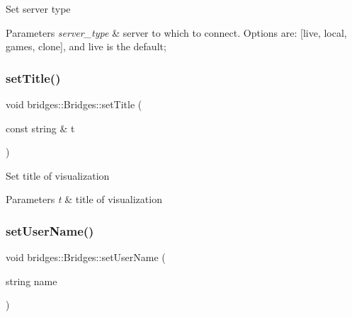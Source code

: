 Set server type


\begin{DoxyParams}{Parameters}
{\em server\+\_\+type} & server to which to connect. Options are\+: \mbox{[}\textquotesingle{}live\textquotesingle{}, \textquotesingle{}local\textquotesingle{}, \textquotesingle{}games\textquotesingle{}, \textquotesingle{}clone\textquotesingle{}\mbox{]}, and \textquotesingle{}live\textquotesingle{} is the default; \\
\hline
\end{DoxyParams}
\mbox{\label{classbridges_1_1_bridges_ac9f2e0b5fd5c70053db233dcbb636b56}} 
\subsubsection{\texorpdfstring{setTitle()}{setTitle()}}
{\footnotesize\ttfamily void bridges\+::\+Bridges\+::set\+Title (\begin{DoxyParamCaption}\item[{const string \&}]{t }\end{DoxyParamCaption})\hspace{0.3cm}{\ttfamily [inline]}}

Set title of visualization


\begin{DoxyParams}{Parameters}
{\em t} & title of visualization \\
\hline
\end{DoxyParams}
\mbox{\label{classbridges_1_1_bridges_a383c5c1d3c85541f466e0cb60dde1c29}} 
\subsubsection{\texorpdfstring{setUserName()}{setUserName()}}
{\footnotesize\ttfamily void bridges\+::\+Bridges\+::set\+User\+Name (\begin{DoxyParamCaption}\item[{string}]{name }\end{DoxyParamCaption})\hspace{0.3cm}{\ttfamily [inline]}}



